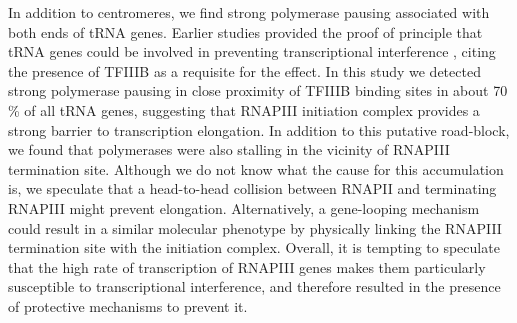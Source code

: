 In addition to centromeres, we find strong polymerase pausing associated with both ends of tRNA genes. 
Earlier studies provided the proof of principle that tRNA genes could be involved in preventing transcriptional interference \cite{korde:2014:intergenic}, citing the presence of TFIIIB as a requisite for the effect. 
In this study we detected strong polymerase pausing in close proximity of TFIIIB binding sites in about 70 \% of all tRNA genes, suggesting that RNAPIII initiation complex provides a strong barrier to transcription elongation. 
In addition to this putative road-block, we found that polymerases were also stalling in the vicinity of RNAPIII termination site. 
Although we do not know what the cause for this accumulation is, we speculate that a head-to-head collision between RNAPII and terminating RNAPIII might prevent elongation. 
Alternatively, a gene-looping mechanism could result in a similar molecular phenotype by physically linking the RNAPIII termination site with the initiation complex. Overall, it is tempting to speculate that the high rate of transcription of RNAPIII genes makes them particularly susceptible to transcriptional interference, and therefore resulted in the presence of protective mechanisms to prevent it.

\clearpage

\newpage
\mbox{}